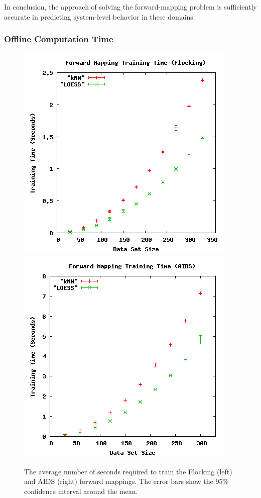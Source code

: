 In conclusion, the \fw approach of solving the forward-mapping problem is sufficiently accurate in predicting system-level behavior in these domains.

  \subsubsection{Offline Computation Time}

\begin{figure}[ht]
\centering
\includegraphics[scale=.4]{images/results_flocking/fmtraining.png}
\includegraphics[scale=.4]{images/results_aids/aids-fmtraining.png}
\caption{The average number of seconds required to train the Flocking (left) and AIDS (right) forward mappings.
The error bars show the 95\% confidence interval around the mean.}
\label{fig:fmtraining}
\end{figure}

